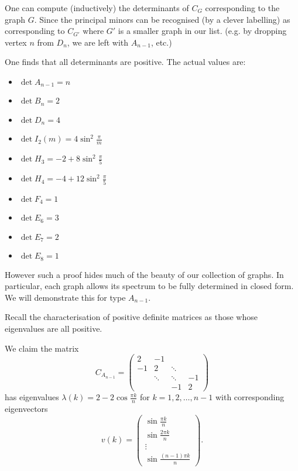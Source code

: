 
One can compute (inductively) the determinants of $C_G$ corresponding to
the graph $G$. Since the principal minors can be recognised (by a clever labelling)
as corresponding to $C_{G'}$ where $G'$ is a smaller graph in our list.
(e.g. by dropping vertex $n$ from $D_n$, we are left with $A_{n-1}$, etc.)

One finds that all determinants are positive. The actual values are:
\begin{itemize}
\item $\det A_{n-1} = n$
\item $\det B_{n} = 2$
\item $\det D_n = 4$
\item $\det I_2(m) = 4 \sin^2 \frac{\pi}{m}$
\item $\det H_3 = -2 + 8 \sin^2 \frac{\pi}{5}$
\item $\det H_4 = -4 + 12 \sin^2 \frac{\pi}{5}$
\item $\det F_4 = 1$
\item $\det E_6 = 3$
\item $\det E_7 = 2$
\item $\det E_8 = 1$
\end{itemize}

However such a proof hides much of the beauty of our collection of graphs. In
particular, each graph allows its spectrum to be fully determined in closed
form. We will demonstrate this for type $A_{n-1}$.

Recall the characterisation of positive definite matrices as those whose
eigenvalues are all positive.

We claim the matrix
\[
    C_{A_{n-1}} = \begin{pmatrix}
    2 & -1 \\
    -1 & 2 & \ddots \\
    & \ddots & \ddots & -1 \\
    & & -1 & 2
    \end{pmatrix}
\]
has eigenvalues $\lambda(k) = 2 - 2 \cos \frac{\pi k}{n}$ for $k=1,2,\dots,n-1$
with corresponding eigenvectors
\[
    v(k) = \begin{pmatrix}
        \sin \frac{\pi k}{n} \\
        \sin \frac{2 \pi k}{n} \\
        \vdots \\
        \sin \frac{(n-1) \pi k}{n}
    \end{pmatrix}.
\]
